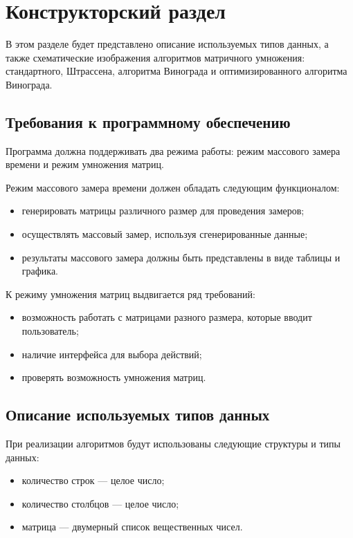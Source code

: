 \chapter{Конструкторский раздел}

В этом разделе будет представлено описание используемых типов данных, а также схематические изображения алгоритмов матричного умножения: 
стандартного, Штрассена, алгоритма Винограда и оптимизированного алгоритма Винограда.

\section{Требования к программному обеспечению}

Программа должна поддерживать два режима работы: режим массового замера времени и режим умножения матриц.

Режим массового замера времени должен обладать следующим функционалом:
\begin{itemize}
	\item генерировать матрицы различного размер для проведения замеров;
	\item осуществлять массовый замер, используя сгенерированные данные;
	\item результаты массового замера должны быть представлены в виде таблицы и графика.
\end{itemize}

К режиму умножения матриц выдвигается ряд требований:
\begin{itemize}
	\item возможность работать с матрицами разного размера, которые вводит пользователь;
	\item наличие интерфейса для выбора действий;
	\item проверять возможность умножения матриц.
\end{itemize}

\section{Описание используемых типов данных}
При реализации алгоритмов будут использованы следующие структуры и типы данных:
\begin{itemize}
	\item количество строк --- целое число;
	\item количество столбцов --- целое число;
	\item матрица --- двумерный список вещественных чисел.
\end{itemize}

